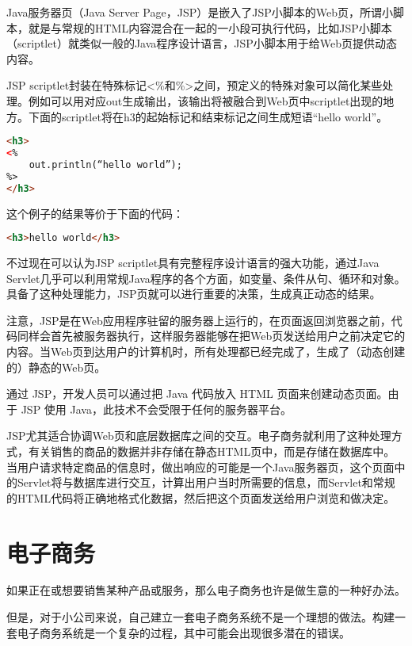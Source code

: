 Java服务器页（Java Server Page，JSP）是嵌入了JSP小脚本的Web页，所谓小脚本，就是与常规的HTML内容混合在一起的一小段可执行代码，比如JSP小脚本（scriptlet）就类似一般的Java程序设计语言，JSP小脚本用于给Web页提供动态内容。

JSP scriptlet封装在特殊标记<\%和\%>之间，预定义的特殊对象可以简化某些处理。例如可以用对应out生成输出，该输出将被融合到Web页中scriptlet出现的地方。下面的scriptlet将在h3的起始标记和结束标记之间生成短语“hello world”。

\begin{lstlisting}[language=HTML]
<h3>
<%
	out.println(“hello world”);
%>
</h3>
\end{lstlisting}

这个例子的结果等价于下面的代码：

\begin{lstlisting}[language=HTML]
<h3>hello world</h3>
\end{lstlisting}


不过现在可以认为JSP scriptlet具有完整程序设计语言的强大功能，通过Java Servlet几乎可以利用常规Java程序的各个方面，如变量、条件从句、循环和对象。具备了这种处理能力，JSP页就可以进行重要的决策，生成真正动态的结果。

注意，JSP是在Web应用程序驻留的服务器上运行的，在页面返回浏览器之前，代码同样会首先被服务器执行，这样服务器能够在把Web页发送给用户之前决定它的内容。当Web页到达用户的计算机时，所有处理都已经完成了，生成了（动态创建的）静态的Web页。


通过 JSP，开发人员可以通过把 Java 代码放入 HTML 页面来创建动态页面。由于 JSP 使用 Java，此技术不会受限于任何的服务器平台。

JSP尤其适合协调Web页和底层数据库之间的交互。电子商务就利用了这种处理方式，有关销售的商品的数据并非存储在静态HTML页中，而是存储在数据库中。当用户请求特定商品的信息时，做出响应的可能是一个Java服务器页，这个页面中的Servlet将与数据库进行交互，计算出用户当时所需要的信息，而Servlet和常规的HTML代码将正确地格式化数据，然后把这个页面发送给用户浏览和做决定。

\section{电子商务}


如果正在或想要销售某种产品或服务，那么电子商务也许是做生意的一种好办法。



但是，对于小公司来说，自己建立一套电子商务系统不是一个理想的做法。构建一套电子商务系统是一个复杂的过程，其中可能会出现很多潜在的错误。


